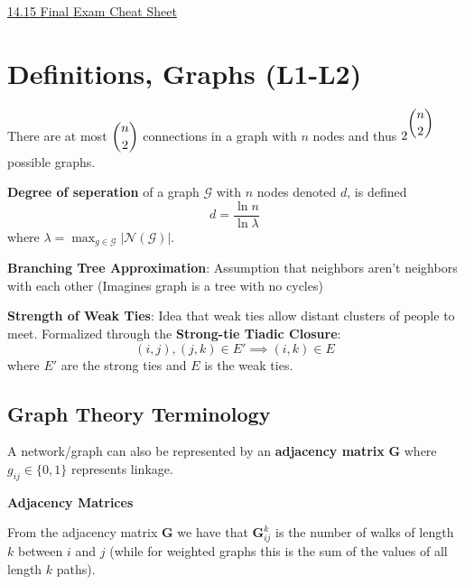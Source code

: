 \documentclass[9pt]{article}
\begin{document}
\raggedright
\begin{multicols}{2}

\setlength{\premulticols}{1pt}
\setlength{\postmulticols}{1pt}
\setlength{\multicolsep}{1pt}
\setlength{\columnsep}{2pt}

\begin{center}
     \Large{\underline{14.15 Final Exam Cheat Sheet}} \\
\end{center}
% 
% 

\section{Definitions, Graphs (L1-L2)}

There are at most $\dbinom{n}{2}$ connections in a graph with $n$ nodes and thus $2^{\dbinom{n}{2}}$ possible graphs. 

\textbf{Degree of seperation} of a graph $\mathcal{G}$ with $n$ nodes denoted $d$, is defined
\begin{equation}d = \frac{\ln n}{\ln \lambda}
\end{equation}where $\lambda=\max_{g \in \mathcal{G}} |\mathcal{N}(\mathcal{G})|$.

\textbf{Branching Tree Approximation}: Assumption that neighbors 
aren't neighbors with each other (Imagines graph is a tree with no
cycles)

\textbf{Strength of Weak Ties}: Idea that weak ties allow distant
clusters of people to meet. Formalized through the \textbf{Strong-tie Tiadic
Closure}: $$(i,j), (j,k) \in E' \implies (i,k) \in E$$ where $E'$ are the 
strong ties and $E$ is the weak ties. 

\subsection{Graph Theory Terminology} 

A network/graph can also be represented by an \textbf{adjacency matrix}
$\mathbf{G}$ where $g_{ij} \in \{0,1\}$ represents linkage. 

\textbf{Adjacency Matrices}

From the adjacency matrix $\mathbf{G}$ we have that $\mathbf{G}^k_{ij}$ is the
number of walks of length $k$ between $i$ and $j$ (while for weighted graphs
this is the sum of the values of all length $k$ paths).


\end{multicols}
\end{document}
